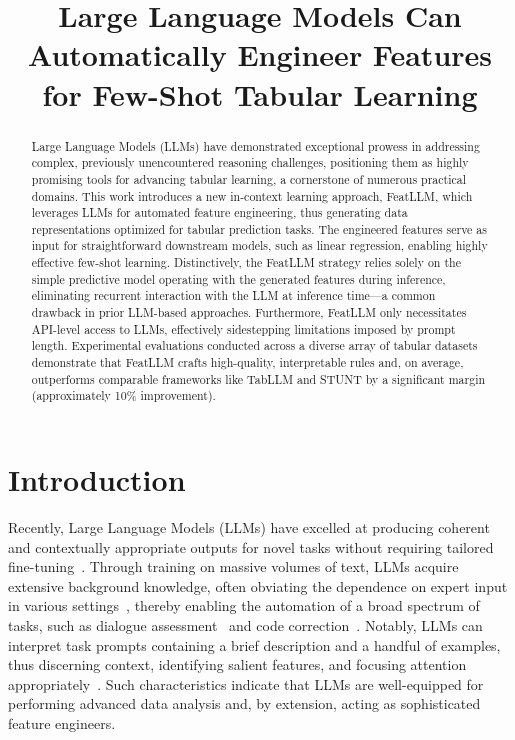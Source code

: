 \title{Large Language Models Can Automatically Engineer Features for Few-Shot Tabular Learning}

\begin{abstract}
Large Language Models (LLMs) have demonstrated exceptional prowess in addressing complex, previously unencountered reasoning challenges, positioning them as highly promising tools for advancing tabular learning, a cornerstone of numerous practical domains. This work introduces a new in-context learning approach, \textsf{FeatLLM}, which leverages LLMs for automated feature engineering, thus generating data representations optimized for tabular prediction tasks. The engineered features serve as input for straightforward downstream models, such as linear regression, enabling highly effective few-shot learning. Distinctively, the \textsf{FeatLLM} strategy relies solely on the simple predictive model operating with the generated features during inference, eliminating recurrent interaction with the LLM at inference time—a common drawback in prior LLM-based approaches. Furthermore, \textsf{FeatLLM} only necessitates API-level access to LLMs, effectively sidestepping limitations imposed by prompt length. Experimental evaluations conducted across a diverse array of tabular datasets demonstrate that \textsf{FeatLLM} crafts high-quality, interpretable rules and, on average, outperforms comparable frameworks like TabLLM and STUNT by a significant margin (approximately 10\% improvement).
\end{abstract}

\section{Introduction}
Recently, Large Language Models (LLMs) have excelled at producing coherent and contextually appropriate outputs for novel tasks without requiring tailored fine-tuning~\cite{creswell2022selection,imani2023mathprompter,taylor2022galactica}. Through training on massive volumes of text, LLMs acquire extensive background knowledge, often obviating the dependence on expert input in various settings~\cite{Genomes2021,singhal2023large,wilcox2003role}, thereby enabling the automation of a broad spectrum of tasks, such as dialogue assessment~\cite{finch2023leveraging} and code correction~\cite{fan2023automated}. Notably, LLMs can interpret task prompts containing a brief description and a handful of examples, thus discerning context, identifying salient features, and focusing attention appropriately~\cite{brown2020language,zhao2023survey}. Such characteristics indicate that LLMs are well-equipped for performing advanced data analysis and, by extension, acting as sophisticated feature engineers.

